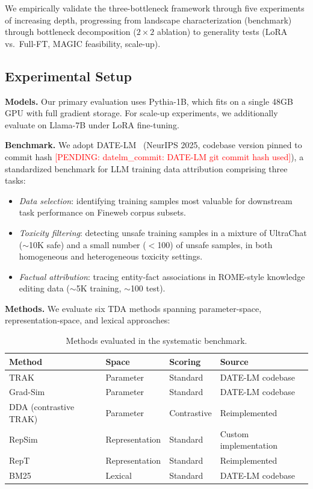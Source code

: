 \documentclass{article}
\newcommand{\pending}[1]{\textcolor{red}{[PENDING: #1]}}
\begin{document}
We empirically validate the three-bottleneck framework through five experiments of increasing depth, progressing from landscape characterization (benchmark) through bottleneck decomposition ($2 \times 2$ ablation) to generality tests (LoRA vs.\ Full-FT, MAGIC feasibility, scale-up).

\subsection{Experimental Setup}

\textbf{Models.} Our primary evaluation uses Pythia-1B, which fits on a single 48GB GPU with full gradient storage. For scale-up experiments, we additionally evaluate on Llama-7B under LoRA fine-tuning.

\textbf{Benchmark.} We adopt DATE-LM~\citep{engstrom2024datelm} (NeurIPS 2025, codebase version pinned to commit hash \pending{datelm\_commit: DATE-LM git commit hash used}), a standardized benchmark for LLM training data attribution comprising three tasks:
\begin{itemize}
    \item \emph{Data selection}: identifying training samples most valuable for downstream task performance on Fineweb corpus subsets.
    \item \emph{Toxicity filtering}: detecting unsafe training samples in a mixture of UltraChat ($\sim$10K safe) and a small number ($<$100) of unsafe samples, in both homogeneous and heterogeneous toxicity settings.
    \item \emph{Factual attribution}: tracing entity-fact associations in ROME-style knowledge editing data ($\sim$5K training, $\sim$100 test).
\end{itemize}

\textbf{Methods.} We evaluate six TDA methods spanning parameter-space, representation-space, and lexical approaches:

\begin{table}[t]
    \centering
    \caption{Methods evaluated in the systematic benchmark.}
    \label{tab:methods}
    \small
    \begin{tabular}{llll}
        \toprule
        Method & Space & Scoring & Source \\
        \midrule
        TRAK & Parameter & Standard & DATE-LM codebase \\
        Grad-Sim & Parameter & Standard & DATE-LM codebase \\
        DDA (contrastive TRAK) & Parameter & Contrastive & Reimplemented \\
        RepSim & Representation & Standard & Custom implementation \\
        RepT & Representation & Standard & Reimplemented \\
        BM25 & Lexical & Standard & DATE-LM codebase \\
        \bottomrule
    \end{tabular}
\end{table}
\end{document}
